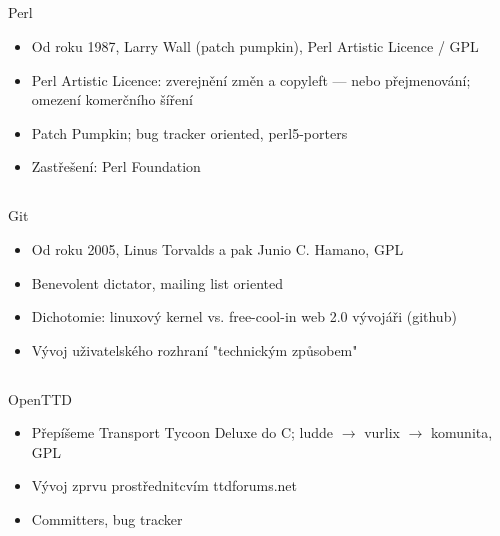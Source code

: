 \documentclass{beamer}
\begin{document}
\subsection{}
\begin{frame}{Perl}
\begin{itemize}
\item Od roku 1987, Larry Wall (patch pumpkin), Perl Artistic Licence / GPL
\item Perl Artistic Licence: zverejnění změn a copyleft --- nebo přejmenování; omezení komerčního šíření
\item Patch Pumpkin; bug tracker oriented, perl5-porters
\item Zastřešení: Perl Foundation
\end{itemize}
\end{frame}

\subsection{}
\begin{frame}{Git}
\begin{itemize}
\item Od roku 2005, Linus Torvalds a pak Junio C. Hamano, GPL
\item Benevolent dictator, mailing list oriented
\item Dichotomie: linuxový kernel vs. free-cool-in web 2.0 vývojáři (github)
\item Vývoj uživatelského rozhraní "technickým způsobem"
\end{itemize}
\end{frame}

\subsection{}
\begin{frame}{OpenTTD}
\begin{itemize}
\item Přepíšeme Transport Tycoon Deluxe do C; ludde $\to$ vurlix $\to$ komunita, GPL
\item Vývoj zprvu prostřednitcvím ttdforums.net
\item Committers, bug tracker
\end{itemize}
\end{frame}
\end{document}
